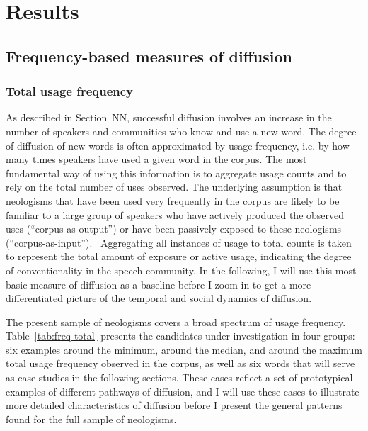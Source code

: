 \documentclass[
  a4paper,
  abstract=on,
  captions=tableabove,
  ]{scrartcl}
\begin{document}
\section{Results}
  \label{sec:results}

  \subsection{Frequency-based measures of diffusion}
    \label{subsec:freq}

    \subsubsection{Total usage frequency}
      \label{subsec:total-freq}

      As described in Section~NN, successful diffusion involves an increase in the number of speakers and communities who know and use a new word. The degree of diffusion of new words is often approximated by usage frequency, i.e. by how many times speakers have used a given word in the corpus. The most fundamental way of using this information is to aggregate usage counts and to rely on the total number of uses observed. The underlying assumption is that neologisms that have been used very frequently in the corpus are likely to be familiar to a large group of speakers who have actively produced the observed uses (\enquote{corpus-as-output}) or have been passively exposed to these neologisms (\enquote{corpus-as-input}).~\parencite{Stefanowitsch2017CorpusbasedPerspective} Aggregating all instances of usage to total counts is taken to represent the total amount of exposure or active usage, indicating the degree of conventionality in the speech community. In the following, I will use this most basic measure of diffusion as a baseline before I zoom in to get a more differentiated picture of the temporal and social dynamics of diffusion.

      The present sample of neologisms covers a broad spectrum of usage frequency. Table~\ref{tab:freq-total} presents the candidates under investigation in four groups: six examples around the minimum, around the median, and around the maximum total usage frequency observed in the corpus, as well as six words that will serve as case studies in the following sections. These cases reflect a set of prototypical examples of different pathways of diffusion, and I will use these cases to illustrate more detailed characteristics of diffusion before I present the general patterns found for the full sample of neologisms.
\end{document}
